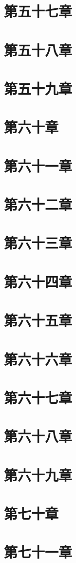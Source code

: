 \documentclass[UTF8]{ctexbook}
\begin{document}
	\section{第五十七章}
	\section{第五十八章}
	\section{第五十九章}
	\section{第六十章}
	\section{第六十一章}
	\section{第六十二章}
	\section{第六十三章}
	\section{第六十四章}
	\section{第六十五章}
	\section{第六十六章}
	\section{第六十七章}
	\section{第六十八章}
	\section{第六十九章}
	\section{第七十章}
	\section{第七十一章}
\end{document}
